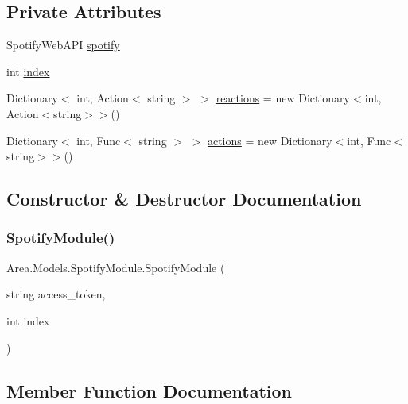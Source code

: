 \subsection*{Private Attributes}
\begin{DoxyCompactItemize}
\item 
Spotify\+Web\+A\+PI \mbox{\hyperlink{classArea_1_1Models_1_1SpotifyModule_a841a0a7d42a90725228be8d7968d904c}{spotify}}
\item 
int \mbox{\hyperlink{classArea_1_1Models_1_1SpotifyModule_acef664652a467d8655e04497e88a7dc5}{index}}
\item 
Dictionary$<$ int, Action$<$ string $>$ $>$ \mbox{\hyperlink{classArea_1_1Models_1_1SpotifyModule_a0cb6ab3cf7f02ab950500d9f89b5a191}{reactions}} = new Dictionary$<$int, Action$<$string$>$$>$()
\item 
Dictionary$<$ int, Func$<$ string $>$ $>$ \mbox{\hyperlink{classArea_1_1Models_1_1SpotifyModule_a475a3891ed32168f52786c8eda6c960a}{actions}} = new Dictionary$<$int, Func$<$string$>$$>$()
\end{DoxyCompactItemize}


\subsection{Constructor \& Destructor Documentation}
\mbox{\label{classArea_1_1Models_1_1SpotifyModule_a8bf87195b9980a22f5183a05242cd18c}} 
\subsubsection{\texorpdfstring{Spotify\+Module()}{SpotifyModule()}}
{\footnotesize\ttfamily Area.\+Models.\+Spotify\+Module.\+Spotify\+Module (\begin{DoxyParamCaption}\item[{string}]{access\+\_\+token,  }\item[{int}]{index }\end{DoxyParamCaption})\hspace{0.3cm}{\ttfamily [inline]}}



\subsection{Member Function Documentation}
\mbox{\label{classArea_1_1Models_1_1SpotifyModule_a81dd73b8c192fb2c22359f53e435b226}} 
